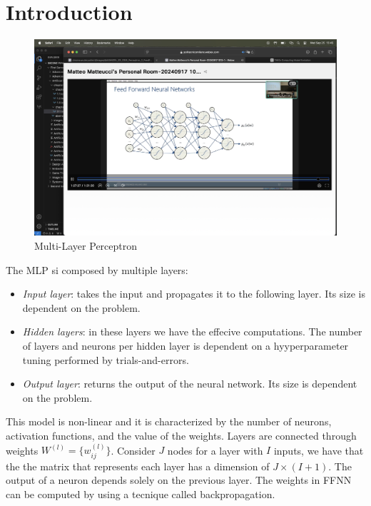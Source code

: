 \section{Introduction}

\begin{figure}[H]
    \centering
    \includegraphics[width=0.75\linewidth]{images/ffnn.png}
    \caption{Multi-Layer Perceptron}
\end{figure}
The MLP si composed by multiple layers:
\begin{itemize}
    \item \textit{Input layer}: takes the input and propagates it to the following layer.
        Its size is dependent on the problem.
    \item \textit{Hidden layers}: in these layers we have the effecive computations. 
        The number of layers and neurons per hidden layer is dependent on a hyyperparameter tuning performed by trials-and-errors. 
    \item \textit{Output layer}: returns the output of the neural network.
        Its size is dependent on the problem.
\end{itemize}
This model is non-linear and it is characterized by the number of neurons, activation functions, and the value of the weights. 
Layers are connected through weights $W^{(l)}=\{w_{ij}^{(l)}\}$. 
Consider $J$ nodes for a layer with $I$ inputs, we have that the the matrix that represents each layer has a dimension of $J \times (I+1)$. 
The output of a neuron depends solely on the previous layer. 
The weights in FFNN can be computed by using a tecnique called backpropagation.